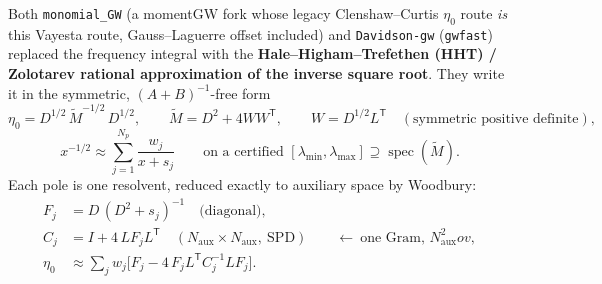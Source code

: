 \documentclass[11pt,a4paper]{article}
\newcommand{\code}[1]{\texttt{\small #1}}
\newcommand{\Naux}{N_{\mathrm{aux}}}
\newcommand{\Np}{N_{p}}
\newcommand{\ov}{ov}
\newcommand{\Mt}{\tilde{M}}
\begin{document}
Both \code{monomial\_GW} (a momentGW fork whose legacy Clenshaw--Curtis $\eta_0$ route \emph{is}
this Vayesta route, Gauss--Laguerre offset included) and \code{Davidson-gw} (\code{gwfast})
replaced the frequency integral with the \textbf{Hale--Higham--Trefethen (HHT) / Zolotarev
rational approximation of the inverse square root}. They write it in the symmetric,
$(A+B)^{-1}$-free form
\begin{equation}
  \eta_0 = D^{1/2}\,\Mt^{-1/2}\,D^{1/2},\qquad
  \Mt = D^2 + 4WW^{\mathsf T},\qquad W = D^{1/2}L^{\mathsf T}
  \quad(\text{symmetric positive definite}),
\end{equation}
\begin{equation}
  x^{-1/2} \approx \sum_{j=1}^{\Np}\frac{w_j}{x+s_j}
  \qquad\text{on a certified } [\lambda_{\min},\lambda_{\max}] \supseteq \operatorname{spec}(\Mt).
\end{equation}
Each pole is one resolvent, reduced exactly to auxiliary space by Woodbury:
\begin{align}
  F_j &= D\,(D^2+s_j)^{-1} \quad\text{(diagonal)},\\
  C_j &= I + 4\,L F_j L^{\mathsf T} \quad(\Naux\times\Naux,\ \text{SPD})
       \qquad\leftarrow\ \text{one Gram, } \Naux^2\ov,\\
  \eta_0 &\approx \sum_j w_j\Big[F_j - 4\,F_jL^{\mathsf T}C_j^{-1}LF_j\Big].
\end{align}
\end{document}
